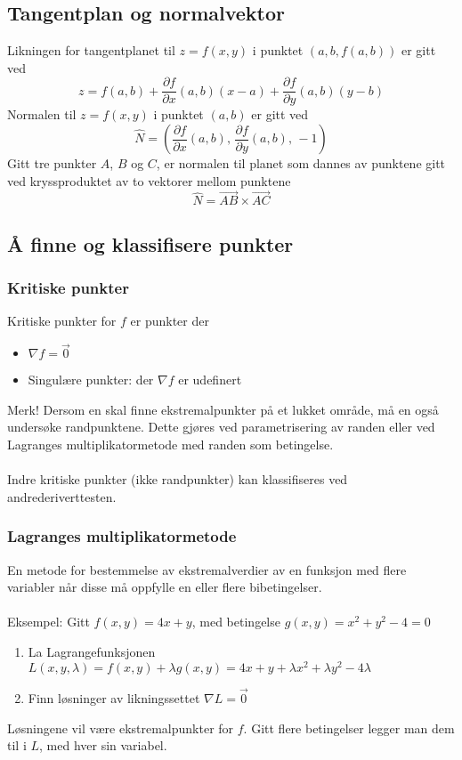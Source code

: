 \documentclass{article}
\begin{document}
\subsection{Tangentplan og normalvektor} \label{Tangentplan og normalvektor}
Likningen for tangentplanet til $z = f(x, y)$ i punktet $(a, b, f(a, b))$ er gitt ved
\[z = f(a, b) + \frac{\partial f}{\partial x}(a, b)(x - a) + \frac{\partial f}{\partial y}(a, b)(y - b)\]
Normalen til $z = f(x, y)$ i punktet $(a, b)$ er gitt ved
\[\hat{N} = \left( \frac{\partial f}{\partial x}(a, b),\,\frac{\partial f}{\partial y}(a, b),\,-1 \right)\]
Gitt tre punkter $A$, $B$ og $C$, er normalen til planet som dannes av punktene gitt ved kryssproduktet av to vektorer mellom punktene
\[\hat{N} = \overrightarrow{AB} \times \overrightarrow{AC}\]

\subsection{Å finne og klassifisere punkter}

\subsubsection{Kritiske punkter}
Kritiske punkter for $f$ er punkter der
\begin{itemize}
    \item $\nabla f = \overrightarrow{0}$
    \item Singulære punkter: der $\nabla f$ er udefinert
\end{itemize}
Merk! Dersom en skal finne ekstremalpunkter på et lukket område, må en også undersøke randpunktene. Dette gjøres ved parametrisering av randen eller ved Lagranges multiplikatormetode med randen som betingelse.\\\\
Indre kritiske punkter (ikke randpunkter) kan klassifiseres ved andrederiverttesten.

\subsubsection{Lagranges multiplikatormetode}
En metode for bestemmelse av ekstremalverdier av en funksjon med flere variabler når disse må oppfylle en eller flere bibetingelser.\\\\
Eksempel: Gitt $f(x, y) = 4x + y$, med betingelse $g(x, y) = x^2 + y^2 - 4 = 0$
\begin{enumerate}
    \item La Lagrangefunksjonen $L(x, y, \lambda) = f(x, y) + \lambda g(x, y) = 4x + y + \lambda x^2 + \lambda y^2 - 4 \lambda$
    \item Finn løsninger av likningssettet $\nabla L = \overrightarrow{0}$
\end{enumerate}
Løsningene vil være ekstremalpunkter for $f$. Gitt flere betingelser legger man dem til i $L$, med hver sin variabel.
\end{document}
